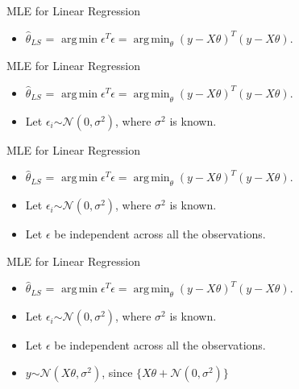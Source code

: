 \documentclass{beamer}
\DeclareMathOperator*{\argmin}{arg\,min}
\begin{document}
\begin{frame}{MLE for Linear Regression}
\begin{itemize}
    \item  $\hat{\theta}_{LS}$ = $\argmin  \epsilon^{T}\epsilon = \argmin_{\theta} (y - X\theta)^{T}(y - X\theta)$.
\end{itemize}
\end{frame}


\begin{frame}{MLE for Linear Regression}
\begin{itemize}
    \item  $\hat{\theta}_{LS}$ = $\argmin  \epsilon^{T}\epsilon = \argmin_{\theta} (y - X\theta)^{T}(y - X\theta)$.
    \item Let $\epsilon_i \stackrel{}{\sim} \mathcal{N}(0, \sigma^{2})$, where $\sigma^{2}$ is known.
\end{itemize}
\end{frame}

\begin{frame}{MLE for Linear Regression}
\begin{itemize}
    \item  $\hat{\theta}_{LS}$ = $\argmin  \epsilon^{T}\epsilon = \argmin_{\theta} (y - X\theta)^{T}(y - X\theta)$.
    \item Let $\epsilon_i \stackrel{}{\sim} \mathcal{N}(0, \sigma^{2})$, where $\sigma^{2}$ is known.
    \item Let $\epsilon$ be independent across all the observations.
\end{itemize}
\end{frame}

\begin{frame}{MLE for Linear Regression}
\begin{itemize}
    \item  $\hat{\theta}_{LS}$ = $\argmin  \epsilon^{T}\epsilon = \argmin_{\theta} (y - X\theta)^{T}(y - X\theta)$.
    \item Let $\epsilon_i \stackrel{}{\sim} \mathcal{N}(0, \sigma^{2})$, where $\sigma^{2}$ is known.
    \item Let $\epsilon$ be independent across all the observations.
    \item $y \stackrel{}{\sim} \mathcal{N}(X\theta, \sigma^{2})$, since $\{ X\theta + \mathcal{N}(0, \sigma^{2})\}$
\end{itemize}
\end{frame}

    
\end{document}

